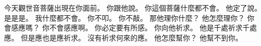 \hypertarget{w01:cue:3580}{}今天觀世音菩薩出現在你面前。
\hypertarget{w01:cue:3581}{}你跟他說。
\hypertarget{w01:cue:3582}{}你這個菩薩什麼都不會。
\hypertarget{w01:cue:3583}{}他定了說。
\hypertarget{w01:cue:3584}{}是是是。
\hypertarget{w01:cue:3585}{}我什麼都不會。
\hypertarget{w01:cue:3586}{}你不叩。
\hypertarget{w01:cue:3587}{}你不敲。
\hypertarget{w01:cue:3588}{}那他理你什麼？
\hypertarget{w01:cue:3589}{}他怎麼理你？
\hypertarget{w01:cue:3590}{}你會感應嗎？
\hypertarget{w01:cue:3591}{}你不會感應啊。
\hypertarget{w01:cue:3592}{}你必定要有所感。
\hypertarget{w01:cue:3593}{}你向他祈求。
\hypertarget{w01:cue:3594}{}他是千處祈求千處應。
\hypertarget{w01:cue:3595}{}但是應也是應祈求。
\hypertarget{w01:cue:3596}{}沒有祈求何來的應。
\hypertarget{w01:cue:3597}{}他怎麼幫你？
\hypertarget{w01:cue:3598}{}他幫不到你。

